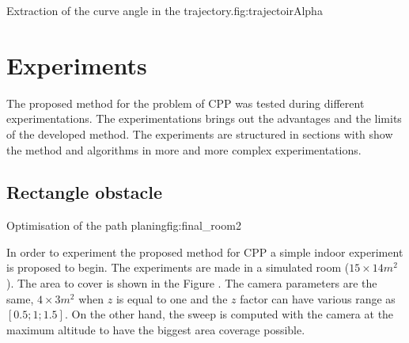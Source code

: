  \begin{mfigures}[!]{Extraction of the curve angle in the trajectory.}{fig:trajectoirAlpha} \centering
{}
\end{mfigures} 
	
	
				



			\section{Experiments} \label{sec:experiment}
			
The proposed method for the problem of CPP was tested during different experimentations. The experimentations brings out the advantages and the limits of the developed method. The experiments are structured in sections with show the method and algorithms in more and more complex experimentations.

\subsection{Rectangle obstacle} \label{experiment}

 \begin{mfigures}[!]{Optimisation of the path planing}{fig:final_room2} \centering
\hspace{1cm}

\tabsVrepPath
\end{mfigures} 

In order to experiment the proposed method for CPP a simple indoor experiment is proposed to begin.
The experiments are made in a simulated room ($15 \times 14 m^2$). The area to cover is shown in the Figure . The camera parameters are the same, $4 \times 3 m^2$ when $z$ is equal to one and the $z$ factor can have various range as $[0.5;1;1.5]$. On the other hand, the sweep is computed with the camera at the maximum altitude to have the biggest area coverage possible.

